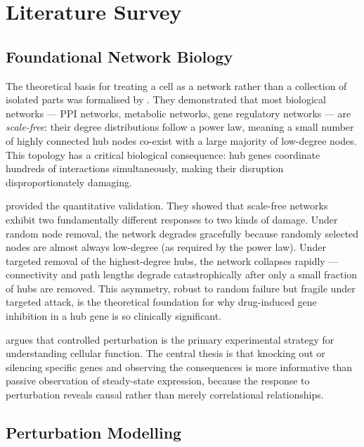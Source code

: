 \documentclass[12pt,a4paper]{report}
\begin{document}
\chapter{Literature Survey}

\section{Foundational Network Biology}

The theoretical basis for treating a cell as a network rather than a collection of isolated parts was formalised by \citet{barabasi2004network}. They demonstrated that most biological networks — PPI networks, metabolic networks, gene regulatory networks — are \textit{scale-free}: their degree distributions follow a power law, meaning a small number of highly connected hub nodes co-exist with a large majority of low-degree nodes. This topology has a critical biological consequence: hub genes coordinate hundreds of interactions simultaneously, making their disruption disproportionately damaging.

\citet{albert2000error} provided the quantitative validation. They showed that scale-free networks exhibit two fundamentally different responses to two kinds of damage. Under random node removal, the network degrades gracefully because randomly selected nodes are almost always low-degree (as required by the power law). Under targeted removal of the highest-degree hubs, the network collapses rapidly — connectivity and path lengths degrade catastrophically after only a small fraction of hubs are removed. This asymmetry, robust to random failure but fragile under targeted attack, is the theoretical foundation for why drug-induced gene inhibition in a hub gene is so clinically significant.

\citet{markowetz2010understand} argues that controlled perturbation is the primary experimental strategy for understanding cellular function. The central thesis is that knocking out or silencing specific genes and observing the consequences is more informative than passive observation of steady-state expression, because the response to perturbation reveals causal rather than merely correlational relationships.

\section{Perturbation Modelling}
\end{document}
